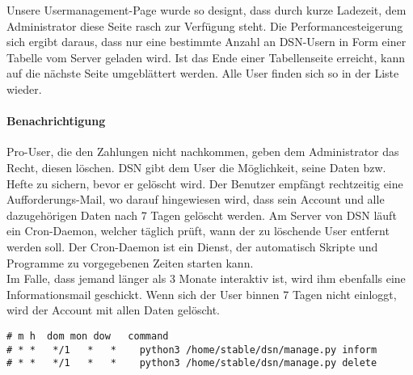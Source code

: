
Unsere Usermanagement-Page wurde so designt, dass durch kurze Ladezeit, dem Administrator diese Seite rasch zur Verfügung steht. Die Performancesteigerung sich ergibt daraus, dass nur eine bestimmte Anzahl an DSN-Usern in Form einer Tabelle vom Server geladen wird. Ist das Ende einer Tabellenseite erreicht, kann auf die nächste Seite umgeblättert werden. Alle User finden sich so in der Liste wieder.

\paragraph{Benachrichtigung}
Pro-User, die den Zahlungen nicht nachkommen, geben dem Administrator das Recht, diesen löschen. DSN gibt dem User die Möglichkeit, seine Daten bzw. Hefte zu sichern, bevor er gelöscht wird. Der Benutzer empfängt rechtzeitig eine Aufforderungs-Mail, wo darauf hingewiesen wird, dass sein Account und alle dazugehörigen Daten nach 7 Tagen gelöscht werden. Am Server von DSN läuft ein Cron-Daemon, welcher täglich prüft, wann der zu löschende User entfernt werden soll. \grqq{}Der Cron-Daemon ist ein Dienst, der automatisch Skripte und Programme zu vorgegebenen Zeiten starten kann.\grqq{}\cite{CRON}\\
Im Falle, dass jemand länger als 3 Monate interaktiv ist, wird ihm ebenfalls eine Informationsmail geschickt. Wenn sich der User binnen 7 Tagen nicht einloggt, wird der Account mit allen Daten gelöscht. \cite{COMMANDS}\cite{CRON}

\begin{lstlisting}[caption={Cronjob für die {\"U}berpr{\"u}fung der Inaktivt{\"a}t und L{\"o}schung}]
# m h  dom mon dow   command
# * *   */1   *   *    python3 /home/stable/dsn/manage.py inform
# * *   */1   *   *    python3 /home/stable/dsn/manage.py delete
\end{lstlisting}